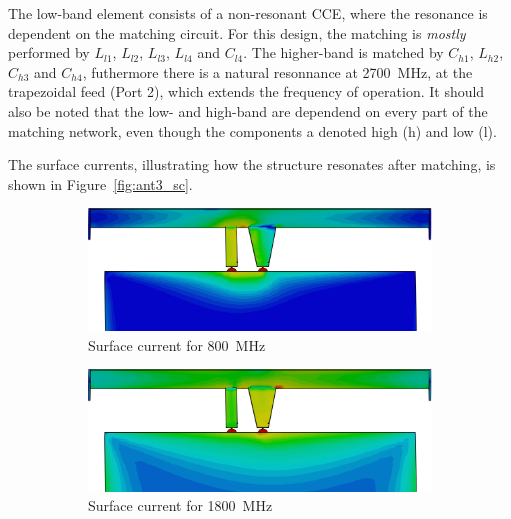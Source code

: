 The low-band element consists of a non-resonant CCE, where the resonance is dependent on the matching circuit. For this design, the matching is \emph{mostly} performed by $L_{l1}$, $L_{l2}$, $L_{l3}$, $L_{l4}$ and $C_{l4}$. The higher-band is matched by $C_{h1}$, $L_{h2}$, $C_{h3}$ and $C_{h4}$, futhermore there is a natural resonnance at \SI{2700}{MHz}, at the trapezoidal feed (Port 2), which extends the frequency of operation. It should also be noted that the low- and high-band are dependend on every part of the matching network, even though the components a denoted high (h) and low (l). 
 
The surface currents, illustrating how the structure resonates after matching, is shown in Figure~\ref{fig:ant3_sc}.


\begin{figure}[htbp]
   \begin{subfigure}[b]{0.32\linewidth}
        \centering
        \includegraphics[width=\linewidth]{img/tech_sol/nonresonant/finka-surface-800}
        \caption{Surface current for \SI{800}{MHz}}
        \label{fig:ant3_sc800}
    \end{subfigure}
    \hfill
    \begin{subfigure}[b]{0.32\linewidth}
        \centering
        \includegraphics[width=\linewidth]{img/tech_sol/nonresonant/finka-surface-1800}
        \caption{Surface current for \SI{1800}{MHz}}
        \label{fig:ant3_sc1800}
    \end{subfigure}
    \hfill
    \begin{subfigure}[b]{0.32\linewidth}

\end{subfigure}
\end{figure}
